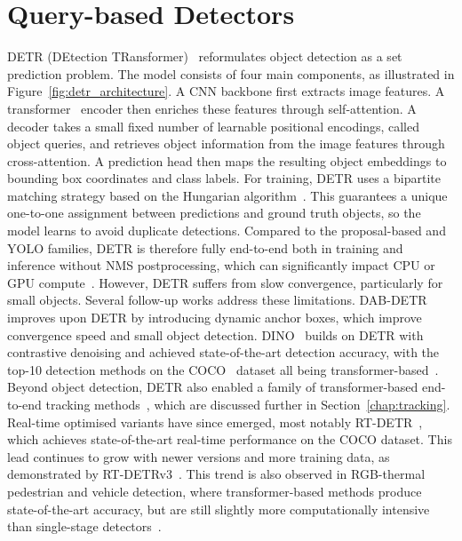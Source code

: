 \documentclass[12pt,oneside,bibtotoc,liststotoc]{scrbook}
\begin{document}
\vspace{-2em}
\section{Query-based Detectors}
\vspace{-0.5em}

DETR (DEtection TRansformer)~\cite{carion2020DETR} reformulates object detection as a set prediction problem.
The model consists of four main components, as illustrated in Figure~\ref{fig:detr_architecture}.
A CNN backbone first extracts image features. A transformer~\cite{vaswani2017attentionIsAllYouNeed} encoder then
enriches these features through self-attention. A decoder takes a small fixed number of learnable positional
encodings, called object queries, and retrieves object information from the image features through cross-attention.
A prediction head then maps the resulting object embeddings to bounding box coordinates and class labels.
For training, DETR uses a bipartite matching strategy based on the Hungarian algorithm~\cite{ramshaw2012hungarianAlgorithm}.
This guarantees a unique one-to-one assignment between predictions and ground truth objects, so the model
learns to avoid duplicate detections. Compared to the proposal-based and YOLO families, DETR is therefore
fully end-to-end both in training and inference without NMS postprocessing, which can significantly impact CPU or GPU
compute~\cite{zhao2024DETRsBeatYolosRealTimeObjectDetection}.
However, DETR suffers from slow convergence, particularly for small objects.
Several follow-up works address these limitations.
DAB-DETR~\cite{liu2022DAB_DETR} improves upon DETR by introducing dynamic anchor boxes, which improve convergence
speed and small object detection. DINO~\cite{zhang2022DINO} builds on DETR with contrastive denoising and achieved
state-of-the-art detection accuracy, with the top-10 detection methods on the COCO~\cite{lin2014microsoftCOCO} dataset all being
transformer-based~\cite{zou2023objectDetectionSurvey}.
Beyond object detection, DETR also enabled a family of transformer-based end-to-end tracking
methods~\cite{zeng2022motr}, which are discussed further in Section~\ref{chap:tracking}.
Real-time optimised variants have since emerged, most notably RT-DETR~\cite{zhao2024DETRsBeatYolosRealTimeObjectDetection},
which achieves state-of-the-art real-time performance on the COCO dataset. This lead continues to grow with newer
versions and more training data, as demonstrated by RT-DETRv3~\cite{wang2025RT_DETRv3}.
This trend is also observed in RGB-thermal pedestrian and vehicle detection, where transformer-based methods
produce state-of-the-art accuracy, but are still slightly more computationally intensive than
single-stage detectors~\cite{guo2024damsdet, yuan2024c2former, kotthapalli2025yolov1Toyolov11}.
\end{document}
